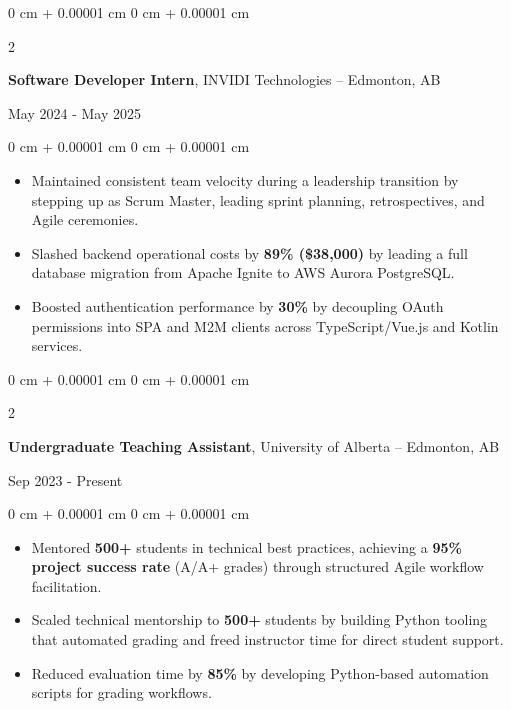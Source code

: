 \documentclass[10pt, letterpaper]{article}
\newenvironment{onecolentry}{
    \begin{adjustwidth}{
        0 cm + 0.00001 cm
    }{
        0 cm + 0.00001 cm
    }
}{
    \end{adjustwidth}
}
\newenvironment{twocolentry}[2][]{
    \onecolentry
    \def\secondColumn{#2}
    \setcolumnwidth{\fill, 6 cm}
    \begin{paracol}{2}
}{
    \switchcolumn \raggedleft \secondColumn
    \end{paracol}
    \endonecolentry
}
\begin{document}
    \vspace{0.10 cm}

    \begin{twocolentry}{May 2024 - May 2025}
        \textbf{Software Developer Intern}, INVIDI Technologies -- Edmonton, AB
    \end{twocolentry}

    \vspace{0.10 cm}
    \begin{onecolentry}
        \begin{itemize}[leftmargin=2em, itemsep=1pt, parsep=0pt, topsep=0pt, partopsep=0pt]
            \item Maintained consistent team velocity during a leadership transition by stepping up as Scrum Master, leading sprint planning, retrospectives, and Agile ceremonies.
            \item Slashed backend operational costs by \textbf{89\% (\$38,000)} by leading a full database migration from Apache Ignite to AWS Aurora PostgreSQL.
            \item Boosted authentication performance by \textbf{30\%} by decoupling OAuth permissions into SPA and M2M clients across TypeScript/Vue.js and Kotlin services.
        \end{itemize}
    \end{onecolentry}

    \vspace{0.10 cm}

    \begin{twocolentry}{Sep 2023 - Present}
        \textbf{Undergraduate Teaching Assistant}, University of Alberta -- Edmonton, AB
    \end{twocolentry}

   \vspace{0.10 cm}
    \begin{onecolentry}
        \begin{itemize}[leftmargin=2em, itemsep=1pt, parsep=0pt, topsep=0pt, partopsep=0pt]
            \item Mentored \textbf{500+} students in technical best practices, achieving a \textbf{95\% project success rate} (A/A+ grades) through structured Agile workflow facilitation.
            \item Scaled technical mentorship to \textbf{500+} students by building Python tooling that automated grading and freed instructor time for direct student support.
            \item Reduced evaluation time by \textbf{85\%} by developing Python-based automation scripts for grading workflows.
        \end{itemize}
    \end{onecolentry}
\end{document}
